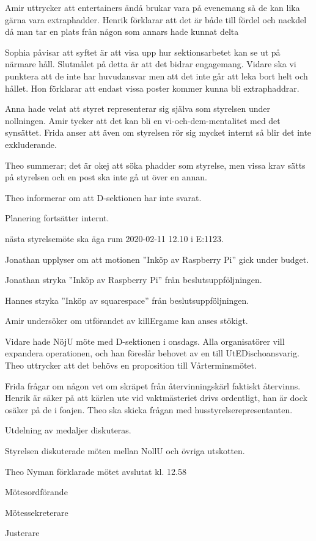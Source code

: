 \documentclass[10pt]{article}
\def\mo{Theo Nyman}
\def\ms{Hannes Björk}
\def\ji{Fredrik Berg}
\begin{document}
\begin{paragrafer}
Amir uttrycker att entertainers ändå brukar vara på evenemang så de kan lika gärna vara extraphadder. Henrik förklarar att det är både till fördel och nackdel då man tar en plats från någon som annars hade kunnat delta 

Sophia påvisar att syftet är att visa upp hur sektionsarbetet kan se ut på närmare håll. Slutmålet på detta är att det bidrar engagemang. Vidare ska vi punktera att de inte har huvudansvar men att det inte går att leka bort helt och hållet. Hon förklarar att endast vissa poster kommer kunna bli extraphaddrar.

Anna hade velat att styret representerar sig själva som styrelsen under nollningen.
Amir tycker att det kan bli en vi-och-dem-mentalitet med det synsättet.
Frida anser att även om styrelsen rör sig mycket internt så blir det inte exkluderande.

Theo summerar; det är okej att söka phadder som styrelse, men vissa krav sätts på styrelsen och en post ska inte gå ut över en annan.


Theo informerar om att D-sektionen har inte svarat.

Planering fortsätter internt.


\Mba nästa styrelsemöte ska äga rum 2020-02-11 12.10 i E:1123.


Jonathan upplyser om att motionen ''Inköp av Raspberry Pi'' gick under budget.

Jonathan \ypa stryka ''Inköp av Raspberry Pi'' från beslutsuppföljningen.

\Mbaby 

Hannes \ypa stryka ''Inköp av squarespace'' från beslutsuppföljningen.

\Mbaby


Amir undersöker om utförandet av killErgame kan anses stökigt.

Vidare hade NöjU möte med D-sektionen i onsdags. Alla organisatörer vill expandera operationen, och han föreslår behovet av en till UtEDischoansvarig. 
Theo uttrycker att det behövs en proposition till Vårterminsmötet.


Frida frågar om någon vet om skräpet från återvinningskärl faktiskt återvinns.
Henrik är säker på att kärlen ute vid vaktmästeriet drivs ordentligt, han är dock osäker på de i foajen.
Theo ska skicka frågan med husstyrelserepresentanten.

Utdelning av medaljer diskuteras.

Styrelsen diskuterade möten mellan NollU och övriga utskotten.

{\mo} förklarade mötet avslutat kl. 12.58
\end{paragrafer}

\hidesignfoot
\begin{signatures}{3}
\signature{\mo}{Mötesordförande}
\signature{\ms}{Mötessekreterare}
\signature{\ji}{Justerare}
\end{signatures}
\end{document}
